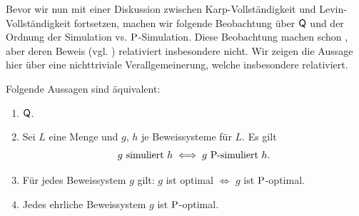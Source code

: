 Bevor wir nun mit einer Diskussion zwischen Karp-Vollständigkeit und Levin-Vollständigkeit fortsetzen, machen wir folgende Beobachtung über $\hQ$ und der Ordnung der Simulation vs. $\P$-Simulation. Diese Beobachtung machen schon \textcite{kobler_is_2000}, aber deren Beweis (vgl. \cite[Thm.~5.2]{messner_simulation_2001}) relativiert insbesondere nicht. Wir zeigen die Aussage hier über eine nichttriviale Verallgemeinerung, welche insbesondere relativiert.
\begin{theorem}\label{thm:q-simulation}
    Folgende Aussagen sind äquivalent:
    \begin{enumerate}
        \item $\hQ$.
        \item Sei $L$ eine Menge und $g$, $h$ je Beweissysteme für $L$. Es gilt
            \[ \text{$g$ simuliert $h$} \iff \text{$g$ $\P$-simuliert $h$}. \]
        \item Für jedes Beweissystem $g$ gilt: $g$ ist optimal $\iff$ $g$ ist $\P$-optimal.
        \item Jedes ehrliche Beweissystem $g$ ist $\P$-optimal.
    \end{enumerate}
\end{theorem}
